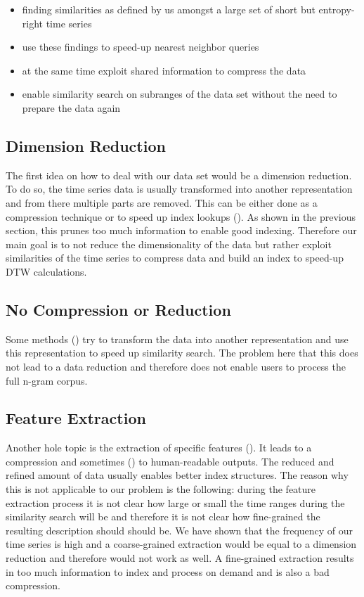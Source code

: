 \begin{itemize}
    \item finding similarities as defined by us amongst a large set of short but entropy-right time series
    \item use these findings to speed-up nearest neighbor queries
    \item at the same time exploit shared information to compress the data
    \item enable similarity search on subranges of the data set without the need to prepare the data again
\end{itemize}


\subsection{Dimension Reduction}
\label{ssec:baseline:prior:dimred}

The first idea on how to deal with our data set would be a dimension reduction. To do so, the time series data is usually transformed into another representation and from there multiple parts are removed. This can be either done as a compression technique or to speed up index lookups (\cite{LB_Keogh,LB_Improved,dimred1,dimred2}). As shown in the previous section, this prunes too much information to enable good indexing. Therefore our main goal is to not reduce the dimensionality of the data but rather exploit similarities of the time series to compress data and build an index to speed-up DTW calculations.


\subsection{No Compression or Reduction}
\label{ssec:baseline:prior:nocompression}

Some methods (\cite{dimred3,dimred4}) try to transform the data into another representation and use this representation to speed up similarity search. The problem here that this does not lead to a data reduction and therefore does not enable users to process the full n-gram corpus.


\subsection{Feature Extraction}
\label{ssec:baseline:prior:extract}

Another hole topic is the extraction of specific features (\cite{compress1,compress2,compress3,compress4,compress5}). It leads to a compression and sometimes (\cite{compress1}) to human-readable outputs. The reduced and refined amount of data usually enables better index structures. The reason why this is not applicable to our problem is the following: during the feature extraction process it is not clear how large or small the time ranges during the similarity search will be and therefore it is not clear how fine-grained the resulting description should should be. We have shown that the frequency of our time series is high and a coarse-grained extraction would be equal to a dimension reduction and therefore would not work as well. A fine-grained extraction results in too much information to index and process on demand and is also a bad compression.


